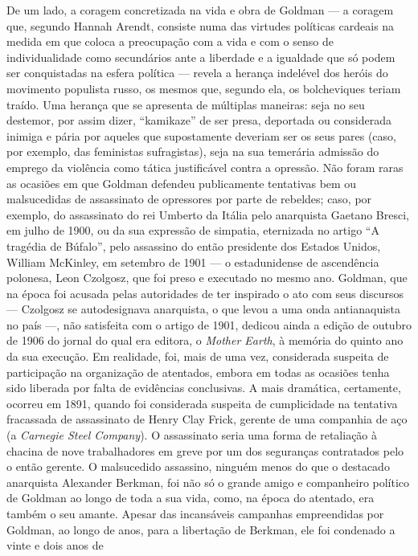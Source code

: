 De um lado, a coragem concretizada na vida e obra de Goldman --- a
coragem que, segundo Hannah Arendt, consiste numa das virtudes políticas
cardeais na medida em que coloca a preocupação com a vida e com o senso
de individualidade como secundários ante a liberdade e a igualdade que
só podem ser conquistadas na esfera política --- revela a herança
indelével dos heróis do movimento populista russo, os mesmos que,
segundo ela, os bolcheviques teriam traído. Uma herança que se apresenta
de múltiplas maneiras: seja no seu destemor, por assim dizer,
``kamikaze'' de ser presa, deportada ou considerada inimiga e pária por
aqueles que supostamente deveriam ser os seus pares (caso, por exemplo,
das feministas sufragistas), seja na sua temerária admissão do emprego
da violência como tática justificável contra a opressão. Não foram raras
as ocasiões em que Goldman defendeu publicamente tentativas bem ou
malsucedidas de assassinato de opressores por parte de rebeldes; caso,
por exemplo, do assassinato do rei Umberto da Itália pelo anarquista
Gaetano Bresci, em julho de 1900, ou da sua expressão de simpatia,
eternizada no artigo ``A tragédia de Búfalo'', pelo assassino do então
presidente dos Estados Unidos, William McKinley, em setembro de 1901 ---
o estadunidense de ascendência polonesa, Leon Czolgosz, que foi preso e
executado no mesmo ano. Goldman, que na época foi acusada pelas
autoridades de ter inspirado o ato com seus discursos --- Czolgosz se
autodesignava anarquista, o que levou a uma onda antianaquista no país
---, não satisfeita com o artigo de 1901, dedicou ainda a edição de
outubro de 1906 do jornal do qual era editora, o \emph{Mother Earth}, à
memória do quinto ano da sua execução. Em realidade, foi, mais de uma
vez, considerada suspeita de participação na organização de atentados,
embora em todas as ocasiões tenha sido liberada por falta de evidências
conclusivas. A mais dramática, certamente, ocorreu em 1891, quando foi
considerada suspeita de cumplicidade na tentativa fracassada de
assassinato de Henry Clay Frick, gerente de uma companhia de aço (a
\emph{Carnegie Steel Company}). O assassinato seria uma forma de
retaliação à chacina de nove trabalhadores em greve por um dos
seguranças contratados pelo o então gerente. O malsucedido assassino,
ninguém menos do que o destacado anarquista Alexander Berkman, foi não
só o grande amigo e companheiro político de Goldman ao longo de toda a
sua vida, como, na época do atentado, era também o seu amante. Apesar
das incansáveis campanhas empreendidas por Goldman, ao longo de anos,
para a libertação de Berkman, ele foi condenado a vinte e dois anos de
